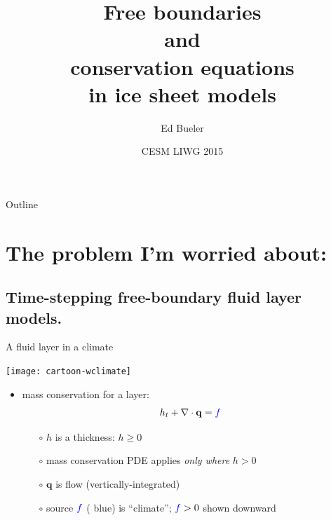 \documentclass{beamer}
\title[Free boundaries and conservation equations] %
{Free boundaries \\ and \\ conservation equations \\  in ice sheet models}
\author{Ed Bueler}
\institute[UAF] %
{
  Dept of Mathematics and Statistics, and Geophysical Institute\\
  University of Alaska Fairbanks%
}
\date{CESM LIWG 2015}
\newcommand\bq{\mathbf{q}}
\newcommand{\Div}{\nabla\cdot}
\begin{document}
\graphicspath{{../images/}{../../talks-public/commonfigs/}}

\begin{frame}
  \titlepage
\end{frame}

\begin{frame}{Outline}
  \tableofcontents
\end{frame}


\section{The problem I'm worried about:}

\subsection{Time-stepping free-boundary fluid layer models.}

\begin{frame}{A fluid layer in a climate}

\begin{center}
\texttt{[image: cartoon-wclimate]}
\end{center}

\vspace{-7mm}
  \begin{itemize}
  \item mass conservation for a layer:
      $$h_t + \Div\bq = {\color{blue} f}$$
    \begin{itemize}
    \vspace{-4mm}
    \item[$\circ$] $h$ is a thickness: $h\ge 0$
    \item[$\circ$] mass conservation PDE applies \emph{only where} $h>0$
    \item[$\circ$] $\bq$ is flow (vertically-integrated)
    \item[$\circ$] source ${\color{blue} f}$ ({\color{blue} blue}) is ``climate''; ${\color{blue} f}>0$ shown downward
    \end{itemize}
  \end{itemize}
\end{frame}
\end{document}
